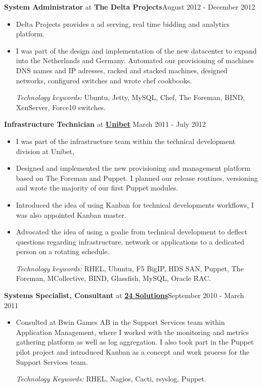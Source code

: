 \documentclass[8pt]{article}
\newenvironment{outerlist}[1][\enskip\textbullet]%
        {\begin{itemize}[#1]}{\end{itemize}%
         \vspace{-.6\baselineskip}}
\newcommand{\blankline}{\quad\pagebreak[2]}
\begin{document}
\textbf{System Administrator} at {\textbf{The Delta Projects}}\hfill {August 2012 - December 2012}
\begin{outerlist}
\item[] Delta Projects provides a ad serving, real time bidding and analytics platform.

\item[] I was part of the design and implementation of the new datacenter to expand into the Netherlands and Germany. Automated our provisioning of machines DNS names and IP adresses, racked and stacked machines, designed networks, configured switches and wrote chef cookbooks.

\textit{Technology keywords:} Ubuntu, Jetty, MySQL, Chef, The Foreman, BIND, XenServer, Force10 switches. 
\end{outerlist}
\blankline

\textbf{Infrastructure Technician} at \href{http://www.unibet.com}{\textbf{Unibet}}  \hfill {March 2011 - July 2012}
\begin{outerlist}
	\item[]I was part of the infrastructure team within the technical development division at Unibet, 
	 \item Designed and implemented the new provisioning and management platform based on The Foreman and Puppet. I planned our release routines, versioning and wrote the majority of our first Puppet modules.
	\item Introduced the idea of using Kanban for technical developments workflows, I was also appointed Kanban master.
	\item Advocated the idea of using a goalie from technical development to deflect questions regarding infrastructure, network or applications to a dedicated person on a rotating schedule.

\textit{Technology keywords:} RHEL, Ubuntu, F5 BigIP, HDS SAN, Puppet, The Foreman, MCollective, BIND, Glassfish, MySQL, Oracle RAC.
	
\end{outerlist}
\blankline

 \textbf{Systems Specialist, Consultant} at \href{http://www.24solutions.se}{\textbf{24 Solutions}}\hfill {September 2010 - March 2011}
\begin{outerlist}
	\item[] Consulted at Bwin Games AB in the Support Services team within Application Management, where I worked with the monitoring and metrics gathering platform as well as log aggregation. I also took part in the Puppet pilot project and introduced Kanban as a concept and work process for the Support Services team.

\textit{Technology Keywords:} RHEL, Nagios, Cacti, rsyslog, Puppet.
\end{outerlist}
\blankline
\end{document}
